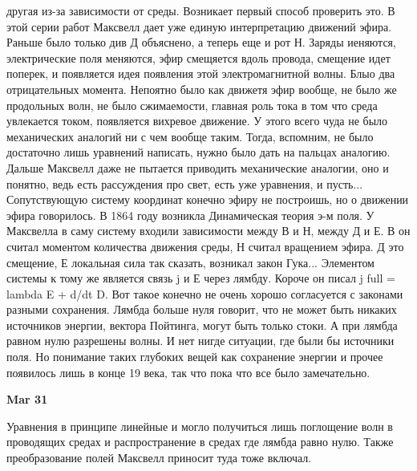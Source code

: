 \documentclass[a4paper, 12pt]{article}
\begin{document}
другая из-за зависимости от среды. Возникает первый способ проверить 
это. В этой серии работ Максвелл дает уже единую интерпретацию движений 
эфира. Раньше было только див Д объяснено, а теперь еще и рот Н. Заряды 
иеняются, электрические поля меняются, эфир смещяется вдоль провода, 
смещение идет поперек, и появляется идея появления этой электромагнитной 
волны. Блыо два отрицательных момента. Непоятно было как движетя эфир 
вообще, не было же продольных волн, не было сжимаемости, главная роль 
тока в том что среда увлекается током, появляется вихревое движение. 
У этого всего чуда не было механических аналогий ни с чем вообще таким. 
Тогда, вспомним, не было достаточно лишь уравнений написать, нужно было 
дать на пальцах аналогию. Дальше Максвелл даже не пытается приводить 
механические аналогии, оно и понятно, ведь есть рассуждения про свет, 
есть уже уравнения, и пусть... Сопутствующую систему координат конечно 
эфиру не построишь, но о движении эфира говорилось. В 1864 году возникла 
Динамическая теория э-м поля. У Максвелла в саму систему входили 
зависимости между В и Н, между Д и Е. В он считал моментом количества 
движения среды, Н считал вращением эфира. Д это смещение, Е локальная 
сила так сказать, возникал закон Гука... Элементом системы к тому же 
является связь j и Е через лямбду. Короче он писал j full = lambda 
E + d/dt D. Вот такое конечно не очень хорошо согласуется с законами 
разными сохранения. Лямбда больше нуля говорит, что не может быть 
никаких источников энергии, вектора Пойтинга, могут быть только стоки. 
А при лямбда равном нулю разрешены волны. И нет нигде ситуации, где были 
бы источники поля. Но понимание таких глубоких вещей как сохранение 
энергии и прочее появилось лишь в конце 19 века, так что пока что все 
было замечательно.

\hfill\textbf{Mar 31}

Уравнения в принципе линейные и могло получиться лишь поглощение волн 
в проводящих средах и распространение в средах где лямбда равно нулю. 
Также преобразование полей Максвелл приносит туда тоже включал.
\end{document}
